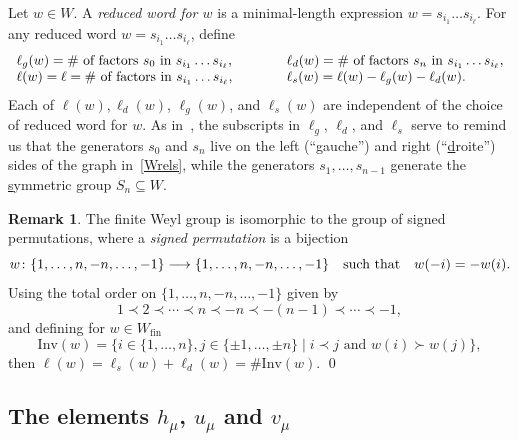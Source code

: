 \documentclass[11pt]{article}
\theoremstyle{plain}
\theoremstyle{definition}
\newtheorem{remark}[thm]{Remark}
\theoremstyle{remark}
\numberwithin{equation}{section}
\newcounter{r}
\newcounter{s}
\begin{document}
Let $w \in W$.  A \emph{reduced word for $w$} is a minimal-length expression $w= s_{i_1}\ldots s_{i_\ell}$.   
For any reduced word $w= s_{i_1}\ldots s_{i_\ell}$, define
\begin{equation}
\begin{array}{lcl}
\ell_g(w) = \hbox{\# of factors $s_0$ in $s_{i_1} \ldots s_{i_\ell}$}, 
& \qquad &
\ell_d(w) = \hbox{\# of factors $s_n$ in $s_{i_1} \ldots s_{i_\ell}$}, 
\nonumber \\
\ell(w) = \ell = \hbox{\# of factors in $s_{i_1} \ldots s_{i_\ell}$}, 
& &
\ell_s(w) = \ell(w)-\ell_g(w)-\ell_d(w).
\label{lengthdef}
\end{array}
\end{equation}
Each of $\ell(w), \ell_d(w)$, $\ell_g(w)$, and $\ell_s(w)$ are independent of the choice of reduced word for $w$.
As in~\cite{CR24}, the subscripts in $\ell_{g}$, $\ell_{d}$, and $\ell_{s}$ serve to remind us that the generators $s_{0}$ and $s_{n}$ live on the left (``\underline{g}auche'') and right (``\underline{d}roite'') sides of the graph in~\eqref{Wrels}, while the generators $s_{1}, \ldots, s_{n-1}$ generate the \underline{s}ymmetric group $S_{n} \subseteq W$.


\begin{remark} \label{sgnorder}
The finite Weyl group is isomorphic to the group of signed permutations, where a \emph{signed permutation} is a bijection 
$$w\colon \{1, \ldots, n, -n, \ldots, -1\} \longrightarrow  \{1, \ldots, n, -n, \ldots, -1\} \quad\hbox{such that}\quad
w(-i) = -w(i).
$$
Using the total order on $\{1,\ldots, n, -n, \ldots, -1\}$ given by
\[
1 \prec 2 \prec \cdots \prec n \prec -n \prec -(n-1) \prec \cdots \prec -1,
\]
and defining for $w\in W_{\mathrm{fin}}$
$$
\mathrm{Inv}(w) = \big\{i \in \{1, \ldots, n\}, j \in \{\pm 1, \ldots, \pm n\} \;|\; \text{$i \prec j$ and $w(i) \succ w(j)$}\big\},
$$
then $\ell(w) = \ell_{s}(w) + \ell_{d}(w) = \#\mathrm{Inv}(w)$.
\qed
\end{remark}


\subsection{The elements $h_\mu$, $u_\mu$ and $v_\mu$}
\end{document}
